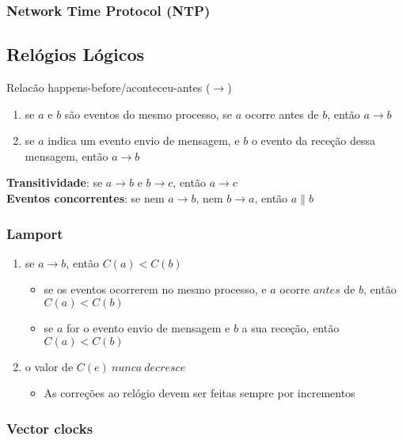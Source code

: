 \documentclass[12pt]{article}
\begin{document}
\subsubsection{Network Time Protocol (NTP)}

\newpage

\subsection{Relógios Lógicos}

Relacão happens-before/aconteceu-antes ($\rightarrow$)

\begin{enumerate}
    \item se $a$ e $b$ são eventos do mesmo processo, se $a$ ocorre antes de $b$, então $a \rightarrow b$
    \item se $a$ indica um evento envio de mensagem, e $b$ o evento da receção dessa mensagem, então $a \rightarrow b$
\end{enumerate}

\textbf{Transitividade}: se $a \rightarrow b$ e $b \rightarrow c$, então $a \rightarrow c$ \\
\textbf{Eventos concorrentes}: se nem $a \rightarrow b$, nem $b \rightarrow a$, então $a \parallel b$

\subsubsection{Lamport}

\begin{enumerate}
    \item se $a \rightarrow b$, então $C(a) < C(b)$
    \begin{itemize}[topsep=0pt]
        \item se os eventos ocorrerem no mesmo processo, e $a$ ocorre $antes$ de $b$, então $C(a) < C(b)$
        \item se $a$ for o evento envio de mensagem e $b$ a sua receção, então $C(a) < C(b)$
    \end{itemize}
    \item o valor de $C(e)\ nunca\ decresce$
    \begin{itemize}[topsep=0pt]
        \item As correções ao relógio devem ser feitas sempre por incrementos
    \end{itemize}
\end{enumerate}

\subsubsection{Vector clocks}
\end{document}
